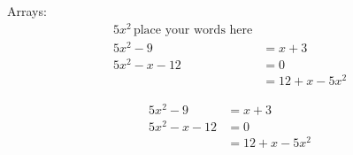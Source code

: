 \documentclass[11pt]{article}
\begin{document}

  Arrays:
  \begin{align}
    5x^2\, \text{place your words here}\\
    5x^2-9&=x+3\\
    5x^2-x-12&=0\\
    &=12+x-5x^2
  \end{align}

  \begin{align*}
    5x^2-9&=x+3\\
    5x^2-x-12&=0\\
    &=12+x-5x^2
  \end{align*}
\end{document}
